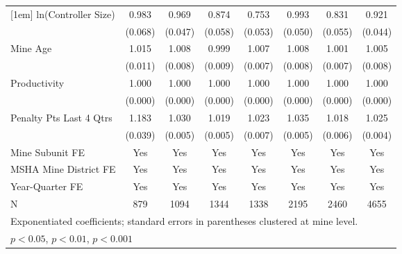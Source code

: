 {\begin{tabular}{l*{7}{c}}
[1em]
ln(Controller Size)      &       0.983         &       0.969         &       0.874\sym{*}  &       0.753\sym{***}&       0.993         &       0.831\sym{**} &       0.921         \\
                         &     (0.068)         &     (0.047)         &     (0.058)         &     (0.053)         &     (0.050)         &     (0.055)         &     (0.044)         \\
[1em]
Mine Age                 &       1.015         &       1.008         &       0.999         &       1.007         &       1.008         &       1.001         &       1.005         \\
                         &     (0.011)         &     (0.008)         &     (0.009)         &     (0.007)         &     (0.008)         &     (0.007)         &     (0.008)         \\
[1em]
Productivity             &       1.000         &       1.000         &       1.000         &       1.000         &       1.000         &       1.000         &       1.000         \\
                         &     (0.000)         &     (0.000)         &     (0.000)         &     (0.000)         &     (0.000)         &     (0.000)         &     (0.000)         \\
[1em]
Penalty Pts Last 4 Qtrs  &       1.183\sym{***}&       1.030\sym{***}&       1.019\sym{***}&       1.023\sym{***}&       1.035\sym{***}&       1.018\sym{**} &       1.025\sym{***}\\
                         &     (0.039)         &     (0.005)         &     (0.005)         &     (0.007)         &     (0.005)         &     (0.006)         &     (0.004)         \\
[1em]
Mine Subunit FE          &         Yes         &         Yes         &         Yes         &         Yes         &         Yes         &         Yes         &         Yes         \\
[1em]
MSHA Mine District FE    &         Yes         &         Yes         &         Yes         &         Yes         &         Yes         &         Yes         &         Yes         \\
[1em]
Year-Quarter FE          &         Yes         &         Yes         &         Yes         &         Yes         &         Yes         &         Yes         &         Yes         \\
\hline
N                        &         879         &        1094         &        1344         &        1338         &        2195         &        2460         &        4655         \\
\hline\hline
\multicolumn{8}{l}{\footnotesize Exponentiated coefficients; standard errors in parentheses clustered at mine level.}\\
\multicolumn{8}{l}{\footnotesize \sym{*} \(p<0.05\), \sym{**} \(p<0.01\), \sym{***} \(p<0.001\)}\\
\end{tabular}
}
